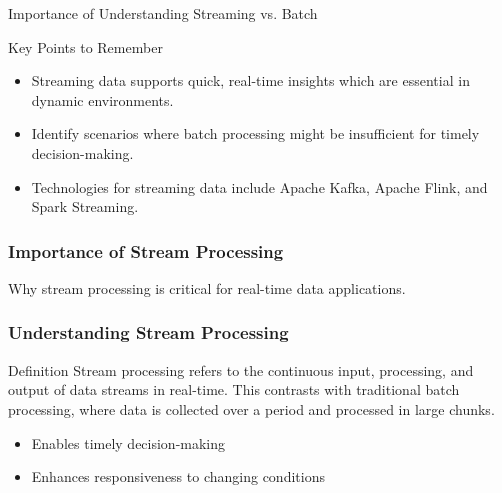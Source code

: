 \documentclass[aspectratio=169]{beamer}
\begin{document}
\begin{frame}[fragile]{Importance of Understanding Streaming vs. Batch}
\begin{block}{Key Points to Remember}
\begin{itemize}
    \item Streaming data supports quick, real-time insights which are essential in dynamic environments.
    \item Identify scenarios where batch processing might be insufficient for timely decision-making.
    \item Technologies for streaming data include Apache Kafka, Apache Flink, and Spark Streaming.
\end{itemize}
\end{block}
\end{frame}

\begin{frame}[fragile]
    \frametitle{Importance of Stream Processing}
    Why stream processing is critical for real-time data applications.
\end{frame}

\begin{frame}[fragile]
    \frametitle{Understanding Stream Processing}
    \begin{block}{Definition}
        Stream processing refers to the continuous input, processing, and output of data streams in real-time. This contrasts with traditional batch processing, where data is collected over a period and processed in large chunks.
    \end{block}
    \begin{itemize}
        \item Enables timely decision-making
        \item Enhances responsiveness to changing conditions
    \end{itemize}
\end{frame}
\end{document}
